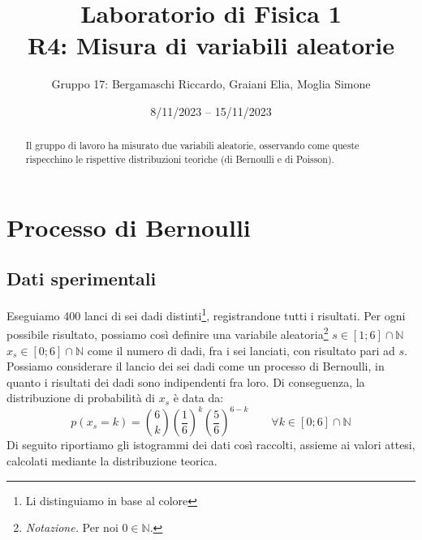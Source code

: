 \documentclass{article}
\title{
    Laboratorio di Fisica 1\\
    R4: Misura di variabili aleatorie
}
\author{Gruppo 17: Bergamaschi Riccardo, Graiani Elia, Moglia Simone}
\date{8/11/2023 – 15/11/2023}
\begin{document}
\maketitle

\begin{abstract}
    Il gruppo di lavoro ha misurato due variabili aleatorie, osservando come queste
    rispecchino le rispettive distribuzioni teoriche (di Bernoulli e di Poisson).
\end{abstract}

\section{Processo di Bernoulli}

\subsection{Dati sperimentali}
Eseguiamo 400 lanci di sei dadi distinti\footnote{Li distinguiamo in base al colore},
registrandone tutti i risultati.
Per ogni possibile risultato, possiamo così
definire una variabile aleatoria\footnote{
    \emph{Notazione.} Per noi $0\in\mathbb{N}$.
} $s\in\left[1;6\right]\cap\mathbb{N}$
$x_s\in\left[0;6\right]\cap\mathbb{N}$ come il
numero di dadi, fra i sei lanciati, con risultato pari ad $s$.
Possiamo considerare il lancio dei sei dadi come un processo di Bernoulli,
in quanto i risultati dei dadi sono indipendenti fra loro. Di conseguenza,
la distribuzione di probabilità di $x_s$ è data da:
\[
    p \left(x_s=k\right) =
        \binom{6}{k}
        \left(\frac{1}{6}\right)^k
        \left(\frac{5}{6}\right)^{6-k}
        \qquad\forall k\in\left[0;6\right]\cap\mathbb{N}
\]
Di seguito riportiamo gli istogrammi dei dati così raccolti, assieme ai valori attesi,
calcolati mediante la distribuzione teorica.


\end{document}
